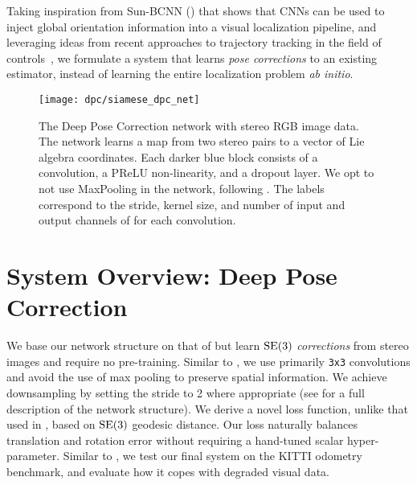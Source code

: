 Taking inspiration from Sun-BCNN () that shows that CNNs can be used to inject global orientation information into a visual localization pipeline, and leveraging ideas from recent approaches to trajectory tracking in the field of controls~\citep{2017_Li_Deep, Punjani2015-pj}, we formulate a system that learns \textit{pose corrections} to an existing estimator, instead of learning the entire localization problem \textit{ab initio}.

\begin{figure}
	\centering
	\texttt{[image: dpc/siamese\_dpc\_net]}
	\caption{The Deep Pose Correction network with stereo RGB image data. 
	The network learns a map from two stereo pairs to a vector of Lie algebra coordinates. 
	Each darker blue block consists of a convolution, a PReLU non-linearity, and a dropout layer. We opt to not use MaxPooling in the network, following \cite{Handa2016-hm}.
	The labels correspond to the stride, kernel size, and number of input and output channels of for each convolution.}
	\label{fig:dpc_net}
	\vspace{-1em}
\end{figure}

\section{System Overview: Deep Pose Correction}

We base our network structure on that of \citep{Handa2016-hm} but learn $\mathrm{SE}(3)$ \textit{corrections} from stereo images and require no pre-training. Similar to \citep{Handa2016-hm}, we use primarily \texttt{3x3} convolutions and avoid the use of max pooling to preserve spatial information. We achieve downsampling by setting the stride to 2 where appropriate (see  for a full description of the network structure). We derive a novel loss function, unlike that used in \cite{Kendall2017-ud, Melekhov2017-dl, Oliveira2017-lt}, based on $\mathrm{SE}(3)$ geodesic distance. Our loss naturally balances translation and rotation error without requiring a hand-tuned scalar hyper-parameter. Similar to \cite{Costante2016-hb}, we test our final system on the KITTI odometry benchmark, and evaluate how it copes with degraded visual data. 

